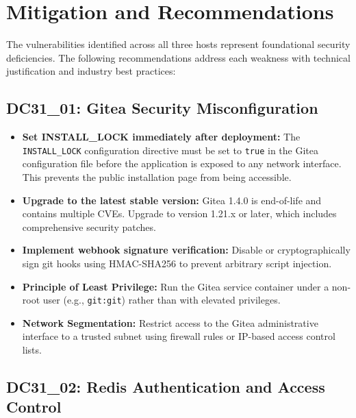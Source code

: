 \documentclass[11pt,a4paper]{article}
\begin{document}
\section{Mitigation and Recommendations}

The vulnerabilities identified across all three hosts represent foundational security deficiencies. The following recommendations address each weakness with technical justification and industry best practices:

\subsection{DC31\_01: Gitea Security Misconfiguration}

\begin{itemize}
    \item \textbf{Set INSTALL\_LOCK immediately after deployment:} The \texttt{INSTALL\_LOCK} configuration directive must be set to \texttt{true} in the Gitea configuration file before the application is exposed to any network interface. This prevents the public installation page from being accessible.
    
    \item \textbf{Upgrade to the latest stable version:} Gitea 1.4.0 is end-of-life and contains multiple CVEs. Upgrade to version 1.21.x or later, which includes comprehensive security patches.
    
    \item \textbf{Implement webhook signature verification:} Disable or cryptographically sign git hooks using HMAC-SHA256 to prevent arbitrary script injection.
    
    \item \textbf{Principle of Least Privilege:} Run the Gitea service container under a non-root user (e.g., \texttt{git:git}) rather than with elevated privileges.
    
    \item \textbf{Network Segmentation:} Restrict access to the Gitea administrative interface to a trusted subnet using firewall rules or IP-based access control lists.
\end{itemize}

\subsection{DC31\_02: Redis Authentication and Access Control}
\end{document}
